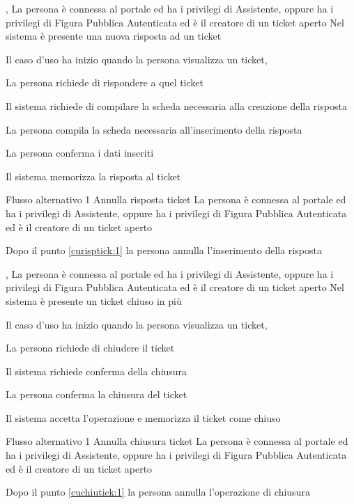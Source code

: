 
{, }
{La persona è connessa al portale ed ha i privilegi di Assistente, oppure ha i privilegi di Figura Pubblica Autenticata ed è il creatore di un ticket aperto}
{Nel sistema è presente una nuova risposta ad un ticket}
{\begin{enumCU}
	\item Il caso d'uso ha inizio quando la persona visualizza un ticket, 
	\item La persona richiede di rispondere a quel ticket
	\item Il sistema richiede di compilare la scheda necessaria alla creazione della risposta
	\item La persona compila la scheda necessaria all'inserimento della risposta\label{curisptick:1}
	\item La persona conferma i dati inseriti
	\item Il sistema memorizza la risposta al ticket
\end{enumCU}}
%
{Flusso alternativo 1}%
{Annulla risposta ticket}%
{La persona è connessa al portale ed ha i privilegi di Assistente, oppure ha i privilegi di Figura Pubblica Autenticata ed è il creatore di un ticket aperto}%
{\postNulle}%
{\begin{enumCU}
		\item Dopo il punto \ref{curisptick:1} la persona annulla l'inserimento della risposta
	\end{enumCU}}%


{, }
{La persona è connessa al portale ed ha i privilegi di Assistente, oppure ha i privilegi di Figura Pubblica Autenticata ed è il creatore di un ticket aperto}
{Nel sistema è presente un ticket chiuso in più}
{\begin{enumCU}
	\item Il caso d'uso ha inizio quando la persona visualizza un ticket, \label{cuchiutick:0}
	\item La persona richiede di chiudere il ticket
	\item Il sistema richiede conferma della chiusura\label{cuchiutick:1}
	\item La persona conferma la chiusura del ticket
	\item Il sistema accetta l'operazione e memorizza il ticket come chiuso
\end{enumCU}}
%
{Flusso alternativo 1}%
{Annulla chiusura ticket}%
{La persona è connessa al portale ed ha i privilegi di Assistente, oppure ha i privilegi di Figura Pubblica Autenticata ed è il creatore di un ticket aperto}%
{\postNulle}%
{\begin{enumCU}
		\item Dopo il punto \ref{cuchiutick:1} la persona annulla l'operazione di chiusura
	\end{enumCU}}%

